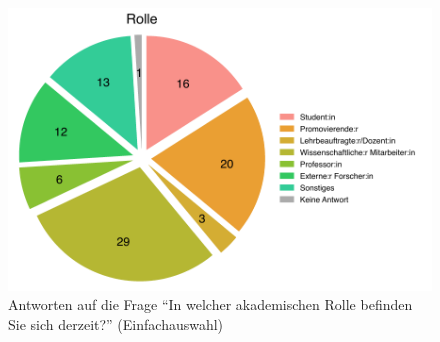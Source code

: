 \documentclass{scrartcl}
\begin{document}
\begin{figure}[t]
   \includegraphics[width=1\textwidth]{rolle.pdf}
   \caption{Antworten auf die Frage \enquote{In welcher akademischen Rolle befinden Sie sich derzeit?} (Einfachauswahl)}
   \label{fig:rolle}
\end{figure}
\end{document}
